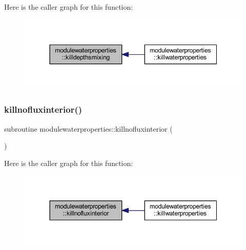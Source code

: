 Here is the caller graph for this function\+:\nopagebreak
\begin{figure}[H]
\begin{center}
\leavevmode
\includegraphics[width=344pt]{namespacemodulewaterproperties_a75dba19ef36b16b901b8d7bab39b00bc_icgraph}
\end{center}
\end{figure}
\mbox{\label{namespacemodulewaterproperties_ad2bfc0be1f4f81fc71b67a511411698e}} 
\subsubsection{\texorpdfstring{killnofluxinterior()}{killnofluxinterior()}}
{\footnotesize\ttfamily subroutine modulewaterproperties\+::killnofluxinterior (\begin{DoxyParamCaption}{ }\end{DoxyParamCaption})\hspace{0.3cm}{\ttfamily [private]}}

Here is the caller graph for this function\+:\nopagebreak
\begin{figure}[H]
\begin{center}
\leavevmode
\includegraphics[width=344pt]{namespacemodulewaterproperties_ad2bfc0be1f4f81fc71b67a511411698e_icgraph}
\end{center}
\end{figure}
\mbox{\label{namespacemodulewaterproperties_a656b771bc1432d56a5e5701857e3c914}} 
